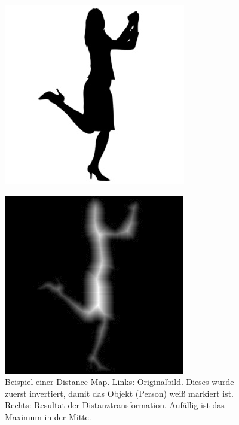 \begin{figure}[h]
	\centering
	\begin{minipage}{4cm}
		\centering
		\includegraphics[width=1.0\linewidth]{./fig/person.jpg}
		\label{fig:beispiel_person}
	\end{minipage}
	\hspace{3cm}
	\begin{minipage}{4cm}
		\centering
		\includegraphics[width=1.0\linewidth]{./fig/distance_map_beispiel}	
	\end{minipage}
	\caption{Beispiel einer Distance Map. Links: Originalbild. Dieses wurde zuerst invertiert, damit das Objekt (Person) weiß markiert ist. Rechts: Resultat der Distanztransformation. Aufällig ist das Maximum in der Mitte.}
	\label{fig:distance_map_beispiel}
\end{figure}
